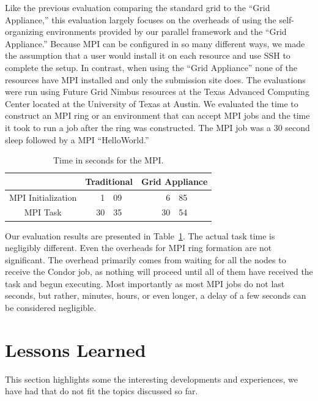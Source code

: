 \documentclass[twocolumn]{svjour3}
\begin{document}
Like the previous evaluation comparing the standard grid to the ``Grid
Appliance,'' this evaluation largely focuses on the overheads of using the
self-organizing environments provided by our parallel framework and the ``Grid
Appliance.'' Because MPI can be configured in so many different ways, we made
the assumption that a user would install it on each resource and use SSH to
complete the setup.  In contrast, when using the ``Grid Appliance'' none of the
resources have MPI installed and only the submission site does.  The
evaluations were run using Future Grid Nimbus resources at the Texas
Advanced Computing Center located at the University of Texas at Austin.  We
evaluated the time to construct an MPI ring or an environment that can accept
MPI jobs and the time it took to run a job after the ring was constructed.  The
MPI job was a 30 second sleep followed by a MPI ``HelloWorld.''

\begin{table}[ht]
\small{
\centering
\begin{tabular}[c]{|c|r@{.}lr@{.}l|} \hline
& \multicolumn{2}{c}{Traditional} & \multicolumn{2}{c|}{Grid Appliance} \\ \hline \hline
MPI Initialization & 1&09 & 6&85 \\ \hline
MPI Task & 30&35 & 30&54 \\ \hline
\end{tabular}
\caption{Time in seconds for the MPI.}
\label{tab:mpi}
}
\end{table}

Our evaluation results are presented in Table~\ref{tab:mpi}.  The actual task
time is negligibly different.  Even the overheads for MPI ring formation are not
significant.  The overhead primarily comes from waiting for all the nodes to
receive the Condor job, as nothing will proceed until all of them have received
the task and begun executing.  Most importantly as most MPI jobs do not last
seconds, but rather, minutes, hours, or even longer, a delay of a few seconds
can be considered negligible.

\section{Lessons Learned}
\label{lessons_learned}

This section highlights some the interesting developments and experiences, we
have had that do not fit the topics discussed so far.  
\end{document}
